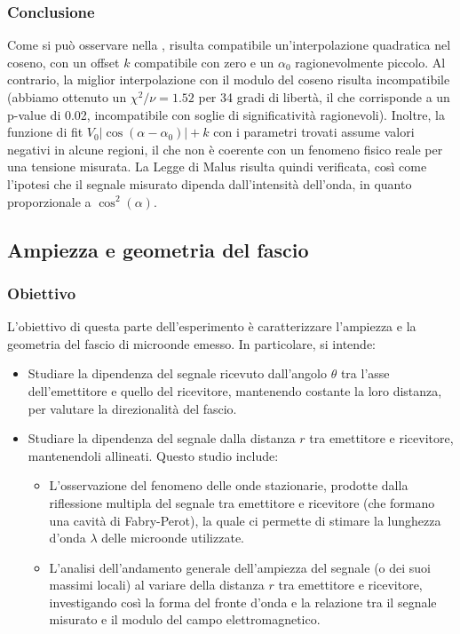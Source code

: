 \documentclass[a4paper]{article}
\begin{document}
\subsubsection{Conclusione}
Come si può osservare nella , risulta compatibile un'interpolazione quadratica nel coseno, con un offset $k$ compatibile con zero e un $\alpha_0$ ragionevolmente piccolo. Al contrario, la miglior interpolazione con il modulo del coseno risulta incompatibile (abbiamo ottenuto un $\chi^2/\nu = \num{1.52}$ per \num{34} gradi di libertà, il che corrisponde a un p-value di 0.02, incompatibile con soglie di significatività ragionevoli). Inoltre, la funzione di fit $V_0 |\cos(\alpha - \alpha_0)| + k$ con i parametri trovati assume valori negativi in alcune regioni, il che non è coerente con un fenomeno fisico reale per una tensione misurata.
La Legge di Malus risulta quindi verificata, così come l'ipotesi che il segnale misurato dipenda dall'intensità dell'onda, in quanto proporzionale a $\cos^2(\alpha)$.

\subsection{Ampiezza e geometria del fascio}
\subsubsection{Obiettivo}
L'obiettivo di questa parte dell'esperimento è caratterizzare l'ampiezza e la geometria del fascio di microonde emesso. In particolare, si intende:
\begin{itemize}
    \item Studiare la dipendenza del segnale ricevuto dall'angolo $\theta$ tra l'asse dell'emettitore e quello del ricevitore, mantenendo costante la loro distanza, per valutare la direzionalità del fascio.
    \item Studiare la dipendenza del segnale dalla distanza $r$ tra emettitore e ricevitore, mantenendoli allineati. Questo studio include:
    \begin{itemize}
        \item L'osservazione del fenomeno delle onde stazionarie, prodotte dalla riflessione multipla del segnale tra emettitore e ricevitore (che formano una cavità di Fabry-Perot), la quale ci permette di stimare la lunghezza d'onda $\lambda$ delle microonde utilizzate.
        \item L'analisi dell'andamento generale dell'ampiezza del segnale (o dei suoi massimi locali) al variare della distanza $r$ tra emettitore e ricevitore, investigando così la forma del fronte d'onda e la relazione tra il segnale misurato e il modulo del campo elettromagnetico.
    \end{itemize}
\end{itemize}
\end{document}
